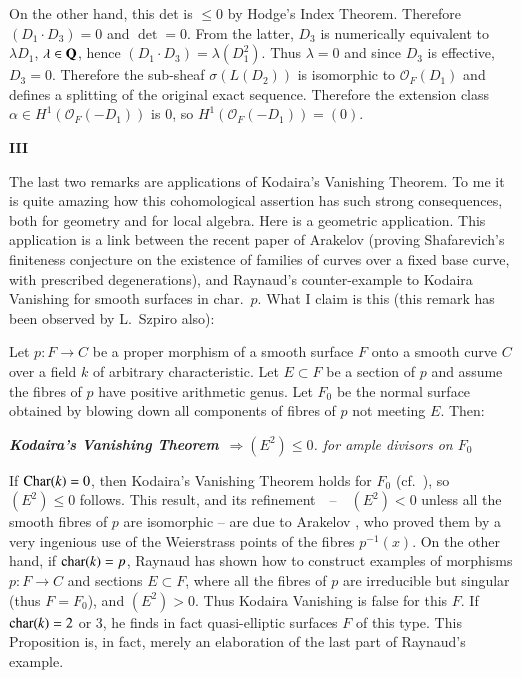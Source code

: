 On the other hand, this det is $\leq 0$ by Hodge's Index
Theorem. Therefore $(D_{1}\cdot D_{3})=0$ and $\det=0$. From the
latter, $D_{3}$ is numerically equivalent to $\lambda D_{1}$,
$\lambda\in \mathbf{Q}$, hence $(D_{1}\cdot D_{3})=\lambda
(D^{2}_{1})$. Thus $\lambda=0$ and since $D_{3}$ is effective,
$D_{3}=0$. Therefore the sub-sheaf $\sigma(L(D_{2}))$ is isomorphic to
$\mathscr{O}_{F}(D_{1})$ and defines a splitting of the original exact
sequence. Therefore the extension class $\alpha\in
H^{1}(\mathscr{O}_{F}(-D_{1}))$ is $0$, so
$H^{1}(\mathscr{O}_{F}(-D_{1}))=(0)$. 

\bigskip

\begin{center}
{\large\bf III}
\end{center}
\smallskip 

The last two remarks are applications of Kodaira's Vanishing
Theorem. To me it is quite amazing how this cohomological assertion
has such strong consequences, both for geometry and for local
algebra. Here is a geometric application. This application is a link
between the recent paper of Arakelov \cite{art01-key1} (proving
Shafarevich's finiteness conjecture on the existence of families of
curves over a fixed base curve, with prescribed degenerations), and
Raynaud's counter-example \cite{art01-key12} to Kodaira Vanishing for
smooth surfaces in char.~$p$. What I claim is this (this remark has
been observed by L.~Szpiro also):

\begin{prop*}
Let $p:F\to C$ be a proper morphism of a smooth surface $F$ onto a
smooth curve $C$ over a field $k$ of arbitrary characteristic. Let
$E\subset F$ be a section of $p$ and assume the fibres of $p$ have
positive arithmetic genus. Let $F_{0}$ be the normal surface obtained
by blowing down all components of fibres of $p$ not meeting $E$. Then:
\end{prop*}

\noindent
{\bf\em Kodaira's Vanishing Theorem}\pageoriginale \
{\em $\Longrightarrow (E^{2})\leq 0$. for ample divisors on $F_{0}$}

If $\operatorname{Char} (k)=0$, then Kodaira's Vanishing Theorem holds for $F_{0}$
(cf.~\cite{art01-key9}), so $(E^{2})\leq 0$ follows. This result, and
its refinement~~--~~$(E^{2})<0$ unless all the smooth fibres of $p$ are
isomorphic -- are due to Arakelov \cite{art01-key1}, who proved them
by a very ingenious use of the Weierstrass points of the fibres
$p^{-1}(x)$. On the other hand, if $\operatorname{char}(k)=p$, Raynaud has shown how
to construct examples of morphisms $p:F\to C$ and sections $E\subset
F$, where all the fibres of $p$ are irreducible but singular (thus
$F=F_{0}$), and $(E^{2})>0$. Thus Kodaira Vanishing is false for this
$F$. If $\operatorname{char}(k)=2$ or $3$, he finds in fact quasi-elliptic surfaces
$F$ of this type. This Proposition is, in fact, merely an elaboration
of the last part of Raynaud's example.

